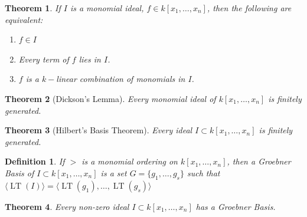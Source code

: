 \documentclass[oneside]{book}
\theoremstyle{mystyle}
\newtheorem{theorem}{Theorem}[section]
\newtheorem{definition}{Definition}[section]
\DeclareMathOperator{\LT}{LT}
\begin{document}
\begin{theorem}
If $I$ is a monomial ideal, $f\in k[x_1,\hdots ,x_n]$, then the following are equivalent:
\begin{enumerate}
    \item $f\in I$
    \item Every term of $f$ lies in $I$.
    \item $f$ is a $k-$linear combination of monomials in $I$.
\end{enumerate}
\end{theorem}
\begin{theorem}[Dickson's Lemma]
Every monomial ideal of $k[x_1,\hdots ,x_n]$ is finitely generated.
\end{theorem}
\begin{theorem}[Hilbert's Basis Theorem]
Every ideal $I\subset k[x_1,\hdots ,x_n]$ is finitely generated.
\end{theorem}
\begin{definition}
If $>$ is a monomial ordering on $k[x_1,\hdots ,x_n]$, then a Groebner Basis of $I\subset k[x_1,\hdots ,x_n]$ is a set $G = \{g_1,\hdots, g_s\}$ such that $\langle \LT(I)\rangle = \langle \LT(g_1),\hdots, \LT(g_s)\rangle$
\end{definition}
\begin{theorem}
Every non-zero ideal $I\subset k[x_1,\hdots ,x_n]$ has a Groebner Basis.
\end{theorem}
\end{document}
